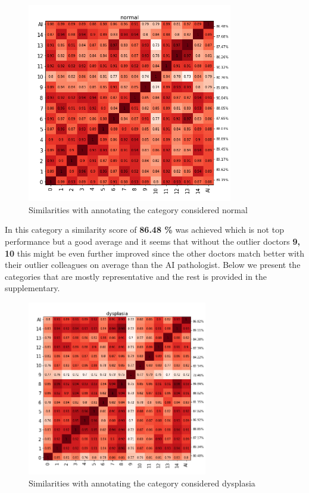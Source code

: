 \documentclass[a4paper,12pt]{article}
\begin{document}
\vspace{4mm}

\begin{figure}[H]
    \centering
    \includegraphics[width=0.8\textwidth]{results/similarities_normal.png}
    \caption{Similarities with annotating the category considered normal}
    \label{fig:sim_normal}
\end{figure}

\vspace{4mm}

\par In this category a similarity score of \textbf{86.48 \%} was achieved which is not top performance but a good average and it seems that without the outlier doctors \textbf{9, 10} this might be even further improved since the other doctors match better with their outlier colleagues on average than the AI pathologist. Below we present the categories that are mostly representative and the rest is provided in the supplementary.

\vspace{4mm}

\begin{figure}[H]
    \centering
    \includegraphics[width=0.7\textwidth]{results/similarities_dysplasia.png}
    \caption{Similarities with annotating the category considered dysplasia}
    \label{fig:sim_dysp}
\end{figure}
\end{document}
